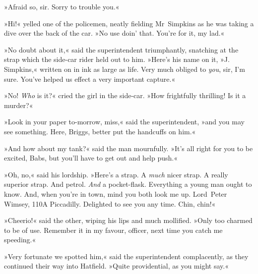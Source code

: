 »Afraid so, sir. Sorry to trouble you.«

»Hi!« yelled one of the policemen, neatly fielding Mr~Simpkins as he was taking a dive over the back of the car. »No use doin' that. You're for it, my lad.«

»No doubt about it,« said the superintendent triumphantly, snatching at the strap which the side-car rider held out to him. »Here's his name on it, »J\@. Simpkins,« written on in ink as large as life. Very much obliged to \textit{you}, sir, I'm sure. You've helped us effect a very important capture.«

»No! \textit{Who} is it?« cried the girl in the side-car. »How frightfully thrilling! Is it a murder?«

»Look in your paper to-morrow, miss,« said the superintendent, »and you may see something. Here, Briggs, better put the handcuffs on him.«

»And how about my tank?« said the man mournfully. »It's all right for you to be excited, Babs, but you'll have to get out and help push.«

»Oh, no,« said his lordship. »Here's a strap. A \textit{much} nicer strap. A really superior strap. And petrol. \textit{And} a pocket-flask. Everything a young man ought to know. And, when you're in town, mind you both look me up. Lord~Peter Wimsey, 110A Piccadilly. Delighted to see you any time. Chin, chin!«

»Cheerio!« said the other, wiping his lips and much mollified. »Only too charmed to be of use. Remember it in my favour, officer, next time you catch me speeding.«

»Very fortunate we spotted him,« said the superintendent complacently, as they continued their way into Hatfield. »Quite providential, as you might say.«

